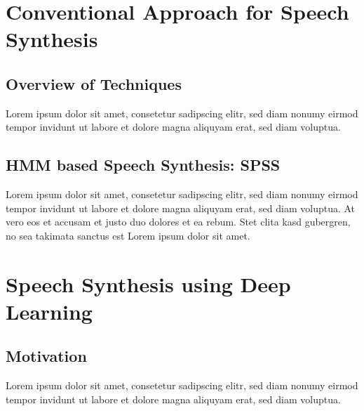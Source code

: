 

\section{Conventional Approach for Speech Synthesis}
\label{sec:conventionalspeech1}

\subsection{Overview of Techniques}

Lorem ipsum dolor sit amet, consetetur sadipscing elitr, sed diam nonumy eirmod tempor invidunt ut labore et dolore magna aliquyam erat, sed diam voluptua. 

\subsection{HMM based Speech Synthesis: \ac{SPSS}}

Lorem ipsum dolor sit amet, consetetur sadipscing elitr, sed diam nonumy eirmod tempor invidunt ut labore et dolore magna aliquyam erat, sed diam voluptua. At vero eos et accusam et justo duo dolores et ea rebum. Stet clita kasd gubergren, no sea takimata sanctus est Lorem ipsum dolor sit amet.

\section{Speech Synthesis using Deep Learning}
\label{sec:deeplearningspeech1}

\subsection{Motivation}

Lorem ipsum dolor sit amet, consetetur sadipscing elitr, sed diam nonumy eirmod tempor invidunt ut labore et dolore magna aliquyam erat, sed diam voluptua.

